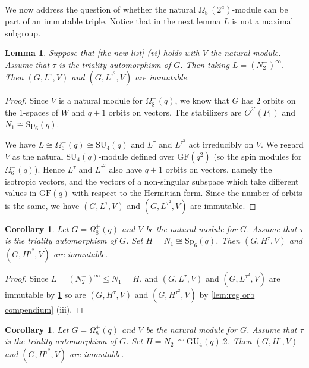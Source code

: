 \documentclass[12pt]{amsart}
\newtheorem{lemma}[theorem]{Lemma}
\newtheorem{corollary}[theorem]{Corollary}
\theoremstyle{remark}
\theoremstyle{notation}
\theoremstyle{definition}
\newcommand{\SU}{\mathrm{SU}}
\newcommand{\GF}{\mathrm{GF}}
\newcommand{\Sp}{\mathrm{Sp}}
\newcommand{\GU}{\mathrm{GU}}
\newcommand{\0}{\emptyset}
\begin{document}
We now address the question of whether the natural $\Omega_8^+(2^a)$-module can be part of an immutable triple. Notice that in the next lemma $L$ is not a maximal subgroup.

\begin{lemma}\label{lem:casevi} Suppose that  \cref{the new list} (vi) holds with $V$ the natural module. Assume that $\tau$ is the triality automorphism of $G$. Then taking $L= (N_2^-)^\infty$. Then $(G,L^\tau,V)$ and $(G,L^{\tau^2},V)$ are immutable.
\end{lemma}



\begin{proof} Since $V$ is a natural module for $\Omega_8^+(q)$, we know that $G$ has $2$ orbits on the $1$-spaces of $W$ and $q+1$ orbits on vectors. The stabilizers are $O^{2'}(P_1)$ and $N_1\cong \Sp_6(q)$.

We have $L\cong \Omega_6^-(q)\cong \SU_4(q)$ and $L^\tau$ and $L^{\tau^2}$ act irreducibly on $V$.  We regard $V$ as the natural $\SU_4(q)$-module defined over $\GF(q^2)$ (so the spin modules for $\Omega_6^-(q)$). Hence $L^\tau$ and $L^{\tau^2}$ also have $q+1$ orbits on vectors, namely the isotropic vectors, and the vectors of a non-singular subspace which take different values in $\GF(q)$ with respect to the Hermitian form. Since the number of orbits is the same, we have $(G,L^\tau,V)$ and $(G,L^{\tau^2},V)$ are immutable.
\end{proof}






\begin{corollary}\label{cor:vi1} Let $G=\Omega_8^+(q)$ and $V$ be the natural module for $G$. Assume that $\tau$ is the triality automorphism of $G$. Set $H= N_1\cong \Sp_6(q)$.  Then $(G,H^\tau,V)$ and $(G,H^{\tau^2},V)$ are immutable.
\end{corollary}

\begin{proof}
Since $L=   (N_{2}^-)^\infty\le N_1=H$, and $(G,L^\tau,V)$ and $(G,L^{\tau^2},V)$ are immutable by \cref{lem:casevi}  so are $(G,H^\tau,V)$ and $(G,H^{\tau^2},V)$ by \cref{lem:reg orb compendium} (iii).
\end{proof}



\begin{corollary}\label{cor:vi2}
Let $G=\Omega_8^+(q)$ and $V$ be the natural module for $G$. Assume that $\tau$ is the triality automorphism of $G$. Set $H= N_2^-\cong \GU_4(q).2$.  Then $(G,H^\tau,V)$ and $(G,H^{\tau^2},V)$ are immutable.
\end{corollary}
\end{document}

